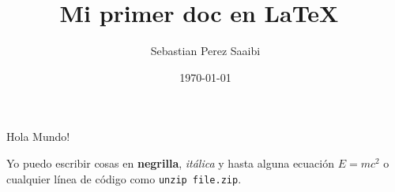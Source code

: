 \documentclass[12pt]{article}
\title{Mi primer doc en \LaTeX\ }
\begin{document}

\date{\today}
\author{Sebastian Perez Saaibi}
\maketitle

Hola Mundo!

Yo puedo escribir cosas en \textbf{negrilla}, \textit{itálica} y hasta alguna ecuación $E=mc^2$ o cualquier línea de código como \verb+unzip file.zip+.
\end{document}
